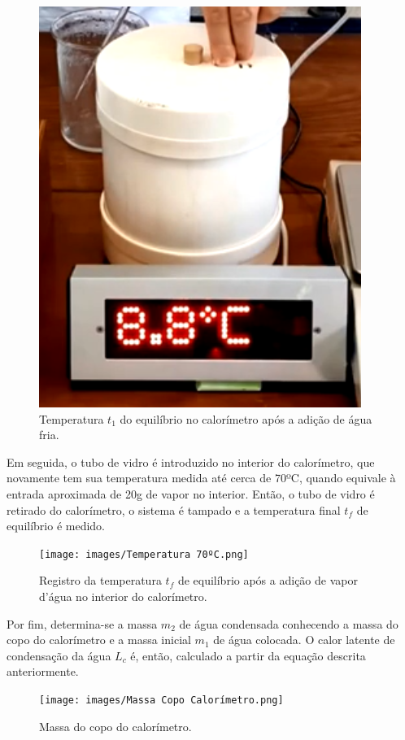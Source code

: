 \begin{figure}[H]
  \centering
  \includegraphics[scale=0.6]{images/Temperatura t1.png}
  \caption{Temperatura $t_1$ do equilíbrio no calorímetro após a adição de água fria.}
\end{figure}

Em seguida, o tubo de vidro é introduzido no interior do calorímetro, que novamente tem sua temperatura medida até cerca de 70ºC, quando equivale à entrada aproximada de 20g de vapor no interior. Então, o tubo de vidro é retirado do calorímetro, o sistema é tampado e a temperatura final $t_f$ de equilíbrio é medido.

\begin{figure}[H]
  \centering
  \texttt{[image: images/Temperatura 70ºC.png]}
  \caption{Registro da temperatura $t_f$ de equilíbrio após a adição de vapor d’água no interior do calorímetro.}
\end{figure}

Por fim, determina-se a massa $m_2$ de água condensada conhecendo a massa do copo do calorímetro e a massa inicial $m_1$ de água colocada. O calor latente de condensação da água $L_c$ é, então, calculado a partir da equação descrita anteriormente.

\begin{figure}[H]
  \centering
  \texttt{[image: images/Massa Copo Calorímetro.png]}
  \caption{Massa do copo do calorímetro.}
\end{figure}

